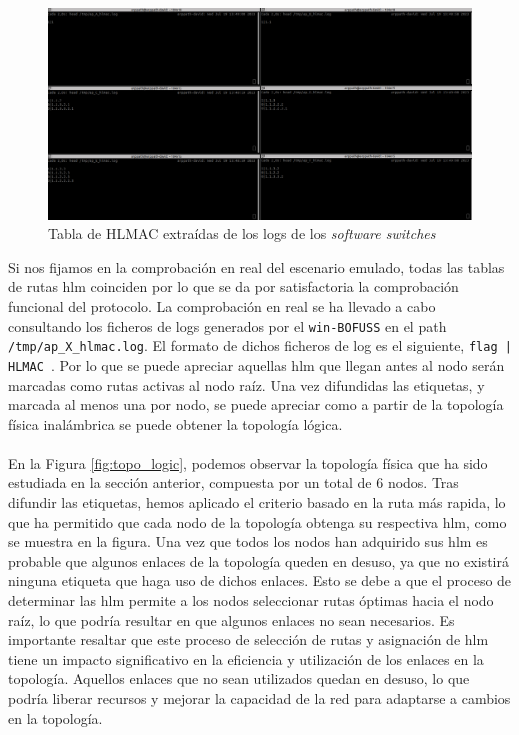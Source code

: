 \newpage
\begin{figure}
    \begin{center}
        \includegraphics[width=\textwidth]{archivos/img/dev/hlmac_real.png}
        \caption{Tabla de HLMAC extraídas de los logs de los \textit{software switches}}
        \label{fig:hlmac_real}
    \end{center}
\end{figure}
\newpage
Si nos fijamos en la comprobación en real del escenario emulado, todas las tablas de rutas \gls{hlm} coinciden por lo que se da por satisfactoria la comprobación funcional del protocolo. La comprobación en real se ha llevado a cabo consultando los ficheros de logs generados por el \texttt{win-BOFUSS} en el path \texttt{/tmp/ap\_X\_hlmac.log}. El formato de dichos ficheros de log es el siguiente, \texttt{flag | HLMAC }. Por lo que se puede apreciar aquellas \gls{hlm} que llegan antes al nodo serán marcadas como rutas activas al nodo raíz. Una vez difundidas las etiquetas, y marcada al menos una por nodo, se puede apreciar como a partir de la topología física inalámbrica se puede obtener la topología lógica.\\
\\
En la Figura \ref{fig:topo_logic}, podemos observar la topología física que ha sido estudiada en la sección anterior, compuesta por un total de 6 nodos. Tras difundir las etiquetas, hemos aplicado el criterio basado en la ruta más rapida, lo que ha permitido que cada nodo de la topología obtenga su respectiva \gls{hlm}, como se muestra en la figura. Una vez que todos los nodos han adquirido sus \gls{hlm} es probable que algunos enlaces de la topología queden en desuso, ya que no existirá ninguna etiqueta que haga uso de dichos enlaces. Esto se debe a que el proceso de determinar las \gls{hlm} permite a los nodos seleccionar rutas óptimas hacia el nodo raíz, lo que podría resultar en que algunos enlaces no sean necesarios. Es importante resaltar que este proceso de selección de rutas y asignación de \gls{hlm} tiene un impacto significativo en la eficiencia y utilización de los enlaces en la topología. Aquellos enlaces que no sean utilizados quedan en desuso, lo que podría liberar recursos y mejorar la capacidad de la red para adaptarse a cambios en la topología.\\
